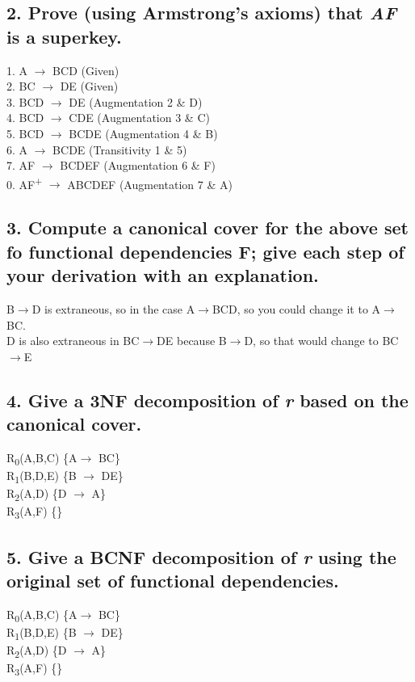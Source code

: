 \documentclass[12pt]{article}
\newcommand\tab[1][1cm]{\hspace*{#1}}
\begin{document}
\subsection*{2. Prove (using Armstrong's axioms) that \textit{AF} is a superkey.}
%
1. A $\rightarrow$ BCD (Given) \\
2. BC $\rightarrow$ DE (Given) \\
3. BCD $\rightarrow$ DE (Augmentation 2 \& D) \\
4. BCD $\rightarrow$ CDE (Augmentation 3 \& C) \\
5. BCD $\rightarrow$ BCDE (Augmentation 4 \& B) \\
6. A $\rightarrow$ BCDE (Transitivity 1 \& 5) \\
7. AF $\rightarrow$ BCDEF (Augmentation 6 \& F) \\
0. AF\textsuperscript{+} $\rightarrow$ ABCDEF (Augmentation 7 \& A) 



\subsection*{3. Compute a canonical cover for the above set fo functional dependencies F; give each step of your derivation with an explanation.}
%
\tab B$\rightarrow$D is extraneous, so in the case A$\rightarrow$BCD, so you could change it to A$\rightarrow$BC. \\
\tab D is also extraneous in BC$\rightarrow$DE because B$\rightarrow$D, so that would change to BC$\rightarrow$E
\subsection*{4. Give a 3NF decomposition of \textit{r} based on the canonical cover.}
R\textsubscript{0}(A,B,C) \{A$\rightarrow$ BC\}\\
R\textsubscript{1}(B,D,E) \{B $\rightarrow$ DE\}\\
R\textsubscript{2}(A,D) \{D $\rightarrow$ A\}\\
R\textsubscript{3}(A,F) \{\}
%
\subsection*{5. Give a BCNF decomposition of \textit{r} using the original set of functional dependencies.}
%
R\textsubscript{0}(A,B,C) \{A$\rightarrow$ BC\}\\
R\textsubscript{1}(B,D,E) \{B $\rightarrow$ DE\}\\
R\textsubscript{2}(A,D) \{D $\rightarrow$ A\}\\
R\textsubscript{3}(A,F) \{\}
%
\end{document}
